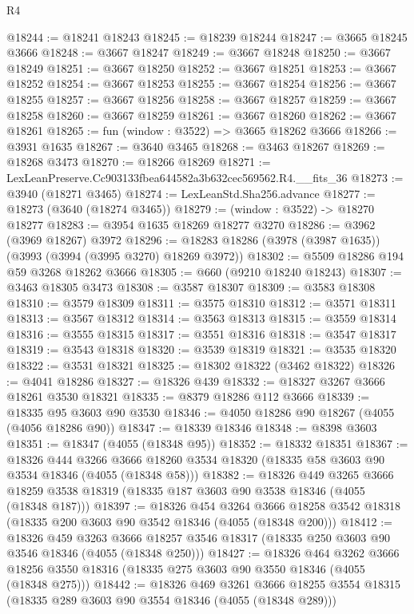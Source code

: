 \begin{lexlean}{R4}
\begin{coremodule}
@18244 := @18241 @18243
@18245 := @18239 @18244
@18247 := @3665 @18245 @3666
@18248 := @3667 @18247
@18249 := @3667 @18248
@18250 := @3667 @18249
@18251 := @3667 @18250
@18252 := @3667 @18251
@18253 := @3667 @18252
@18254 := @3667 @18253
@18255 := @3667 @18254
@18256 := @3667 @18255
@18257 := @3667 @18256
@18258 := @3667 @18257
@18259 := @3667 @18258
@18260 := @3667 @18259
@18261 := @3667 @18260
@18262 := @3667 @18261
@18265 := fun (window : @3522) => @3665 @18262 @3666
@18266 := @3931 @1635
@18267 := @3640 @3465
@18268 := @3463 @18267
@18269 := @18268 @3473
@18270 := @18266 @18269
@18271 := LexLeanPreserve.Cc903133fbea644582a3b632cec569562.R4.__fits_36
@18273 := @3940 (@18271 @3465)
@18274 := LexLeanStd.Sha256.advance
@18277 := @18273 (@3640 (@18274 @3465))
@18279 := (window : @3522) -> @18270 @18277
@18283 := @3954 @1635 @18269 @18277 @3270
@18286 := @3962 (@3969 @18267) @3972
@18296 := @18283 @18286 (@3978 (@3987 @1635)) (@3993 (@3994 (@3995 @3270) @18269 @3972))
@18302 := @5509 @18286 @194 @59 @3268 @18262 @3666
@18305 := @660 (@9210 @18240 @18243)
@18307 := @3463 @18305 @3473
@18308 := @3587 @18307
@18309 := @3583 @18308
@18310 := @3579 @18309
@18311 := @3575 @18310
@18312 := @3571 @18311
@18313 := @3567 @18312
@18314 := @3563 @18313
@18315 := @3559 @18314
@18316 := @3555 @18315
@18317 := @3551 @18316
@18318 := @3547 @18317
@18319 := @3543 @18318
@18320 := @3539 @18319
@18321 := @3535 @18320
@18322 := @3531 @18321
@18325 := @18302 @18322 (@3462 @18322)
@18326 := @4041 @18286
@18327 := @18326 @439
@18332 := @18327 @3267 @3666 @18261 @3530 @18321
@18335 := @8379 @18286 @112 @3666
@18339 := @18335 @95 @3603 @90 @3530
@18346 := @4050 @18286 @90 @18267 (@4055 (@4056 @18286 @90))
@18347 := @18339 @18346
@18348 := @8398 @3603
@18351 := @18347 (@4055 (@18348 @95))
@18352 := @18332 @18351
@18367 := @18326
    @444
    @3266
    @3666
    @18260
    @3534
    @18320
    (@18335 @58 @3603 @90 @3534 @18346 (@4055 (@18348 @58)))
@18382 := @18326
    @449
    @3265
    @3666
    @18259
    @3538
    @18319
    (@18335 @187 @3603 @90 @3538 @18346 (@4055 (@18348 @187)))
@18397 := @18326
    @454
    @3264
    @3666
    @18258
    @3542
    @18318
    (@18335 @200 @3603 @90 @3542 @18346 (@4055 (@18348 @200)))
@18412 := @18326
    @459
    @3263
    @3666
    @18257
    @3546
    @18317
    (@18335 @250 @3603 @90 @3546 @18346 (@4055 (@18348 @250)))
@18427 := @18326
    @464
    @3262
    @3666
    @18256
    @3550
    @18316
    (@18335 @275 @3603 @90 @3550 @18346 (@4055 (@18348 @275)))
@18442 := @18326
    @469
    @3261
    @3666
    @18255
    @3554
    @18315
    (@18335 @289 @3603 @90 @3554 @18346 (@4055 (@18348 @289)))

\end{coremodule}
\end{lexlean}
